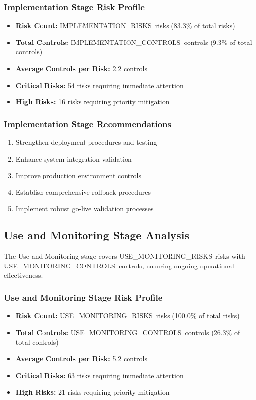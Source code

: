 \documentclass[11pt,a4paper]{article}
\newcommand{\implementationrisks}{{{IMPLEMENTATION_RISKS}}}
\newcommand{\usemonitoringrisks}{{{USE_MONITORING_RISKS}}}
\newcommand{\implementationcontrols}{{{IMPLEMENTATION_CONTROLS}}}
\newcommand{\usemonitoringcontrols}{{{USE_MONITORING_CONTROLS}}}
\begin{document}
\subsubsection{Implementation Stage Risk Profile}
\begin{itemize}
\item \textbf{Risk Count:} \implementationrisks\ risks (83.3\% of total risks)
\item \textbf{Total Controls:} \implementationcontrols\ controls (9.3\% of total controls)
\item \textbf{Average Controls per Risk:} 2.2 controls
\item \textbf{Critical Risks:} 54 risks requiring immediate attention
\item \textbf{High Risks:} 16 risks requiring priority mitigation
\end{itemize}

\subsubsection{Implementation Stage Recommendations}
\begin{enumerate}
\item Strengthen deployment procedures and testing
\item Enhance system integration validation
\item Improve production environment controls
\item Establish comprehensive rollback procedures
\item Implement robust go-live validation processes
\end{enumerate}

\subsection{Use and Monitoring Stage Analysis}

The Use and Monitoring stage covers \usemonitoringrisks\ risks with \usemonitoringcontrols\ controls, ensuring ongoing operational effectiveness.

\subsubsection{Use and Monitoring Stage Risk Profile}
\begin{itemize}
\item \textbf{Risk Count:} \usemonitoringrisks\ risks (100.0\% of total risks)
\item \textbf{Total Controls:} \usemonitoringcontrols\ controls (26.3\% of total controls)
\item \textbf{Average Controls per Risk:} 5.2 controls
\item \textbf{Critical Risks:} 63 risks requiring immediate attention
\item \textbf{High Risks:} 21 risks requiring priority mitigation
\end{itemize}
\end{document}
